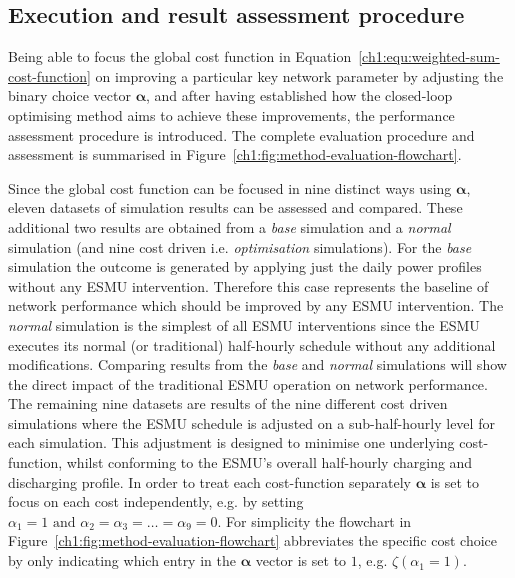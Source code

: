 

\subsection{Execution and result assessment procedure}
\label{ch1:subsec:method-execution}

Being able to focus the global cost function in Equation~\ref{ch1:equ:weighted-sum-cost-function} on improving a particular key network parameter by adjusting the binary choice vector $\boldsymbol{\alpha}$, and after having established how the closed-loop optimising method aims to achieve these improvements, the performance assessment procedure is introduced.
The complete evaluation procedure and assessment is summarised in Figure~\ref{ch1:fig:method-evaluation-flowchart}.



Since the global cost function can be focused in nine distinct ways using $\boldsymbol{\alpha}$, eleven datasets of simulation results can be assessed and compared.
These additional two results are obtained from a \textit{base} simulation and a \textit{normal} simulation (and nine cost driven i.e. \textit{optimisation} simulations).
For the \textit{base} simulation the outcome is generated by applying just the daily power profiles without any ESMU intervention.
Therefore this case represents the baseline of network performance which should be improved by any ESMU intervention.
The \textit{normal} simulation is the simplest of all ESMU interventions since the ESMU executes its normal (or traditional) half-hourly schedule without any additional modifications.
Comparing results from the \textit{base} and \textit{normal} simulations will show the direct impact of the traditional ESMU operation on network performance.
The remaining nine datasets are results of the nine different cost driven simulations where the ESMU schedule is adjusted on a sub-half-hourly level for each simulation.
This adjustment is designed to minimise one underlying cost-function, whilst conforming to the ESMU's overall half-hourly charging and discharging profile.
In order to treat each cost-function separately $\boldsymbol{\alpha}$ is set to focus on each cost independently, e.g. by setting $\alpha_1 = 1 \text{ and } \alpha_2 = \alpha_3 = \dots = \alpha_9 = 0$.
For simplicity the flowchart in Figure~\ref{ch1:fig:method-evaluation-flowchart} abbreviates the specific cost choice by only indicating which entry in the $\boldsymbol{\alpha}$ vector is set to $1$, e.g. $\zeta(\alpha_1=1)$.

